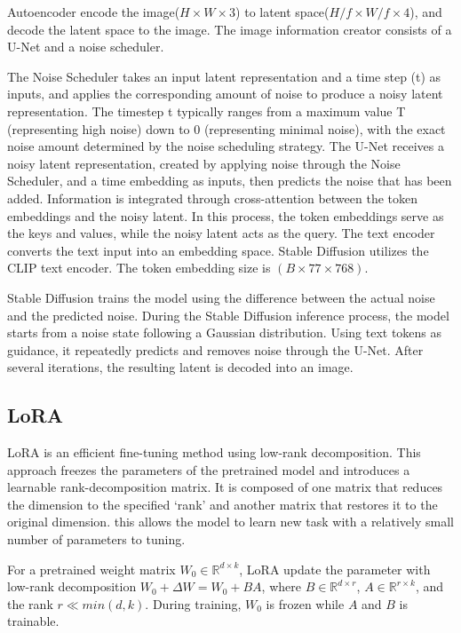 \documentclass[extendedabs]{bmvc2k}
\begin{document}
Autoencoder encode the image($H\times W\times 3$) to latent space($H/f \times W/f \times 4$), and decode the latent space to the image. The image information creator consists of a U-Net and a noise scheduler. 

The Noise Scheduler takes an input latent representation and a time step (t) as inputs, and applies the corresponding amount of noise to produce a noisy latent representation. The timestep t typically ranges from a maximum value T (representing high noise) down to 0 (representing minimal noise), with the exact noise amount determined by the noise scheduling strategy. The U-Net receives a noisy latent representation, created by applying noise through the Noise Scheduler, and a time embedding as inputs, then predicts the noise that has been added. Information is integrated through cross-attention between the token embeddings and the noisy latent. In this process, the token embeddings serve as the keys and values, while the noisy latent acts as the query. The text encoder converts the text input into an embedding space. Stable Diffusion utilizes the CLIP \cite{clip} text encoder. The token embedding size is $(B \times 77 \times 768)$.

Stable Diffusion trains the model using the difference between the actual noise and the predicted noise. During the Stable Diffusion inference process, the model starts from a noise state following a Gaussian distribution. Using text tokens as guidance, it repeatedly predicts and removes noise through the U-Net. After several iterations, the resulting latent is decoded into an image.
\subsection{LoRA}
LoRA\cite{lora} is an efficient fine-tuning method using low-rank decomposition. This approach freezes the parameters of the pretrained model and introduces a learnable rank-decomposition matrix. It is composed of one matrix that reduces the dimension to the specified ‘rank’ and another matrix that restores it to the original dimension. this allows the model to learn new task with a relatively small number of parameters to tuning.

For a pretrained weight matrix $W_0\in \mathbb{R}^{d\times k}$, LoRA update the parameter with low-rank decomposition $W_0 + \Delta W=W_0+BA$, where $B\in \mathbb{R}^{d\times r}$,  $A\in \mathbb{R}^{r\times k}$, and the rank $r \ll min(d,k)$. During training, $W_0$ is frozen while $A$ and $B$ is trainable.
\end{document}
